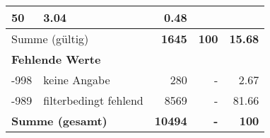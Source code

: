 \begin{longtable}{lXrrr}
       \num{50} &
       \num[round-mode=places,round-precision=2]{3.04} &
         \num[round-mode=places,round-precision=2]{0.48} \\
     \midrule
     \multicolumn{2}{l}{Summe (gültig)} &
       \textbf{\num{1645}} &
     \textbf{\num{100}} &
       \textbf{\num[round-mode=places,round-precision=2]{15.68}} \\
     \multicolumn{5}{l}{\textbf{Fehlende Werte}}\\
       -998 &
       keine Angabe &
         \num{280} &
        - &
         \num[round-mode=places,round-precision=2]{2.67} \\
       -989 &
       filterbedingt fehlend &
         \num{8569} &
        - &
         \num[round-mode=places,round-precision=2]{81.66} \\
     \midrule
     \multicolumn{2}{l}{\textbf{Summe (gesamt)}} &
          \textbf{\num{10494}} &
        \textbf{-} &
        \textbf{\num{100}} \\
     \bottomrule
     \end{longtable}
     
